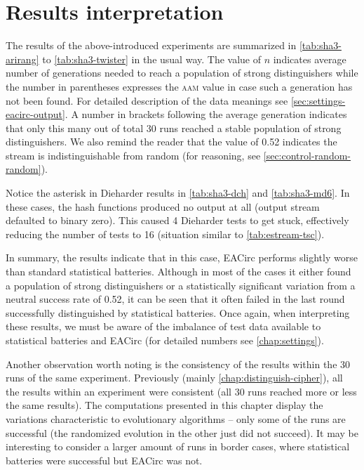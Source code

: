 \documentclass[12pt,oneside]{fithesis2}		%
\renewcommand{\_}{\leavevmode \kern0.0em\vbox{\hrule width0.4em}}
\begin{document}
\section{Results interpretation}
\label{sec:hash-results}

The results of the above-introduced experiments are summarized in \autoref{tab:sha3-arirang} to \autoref{tab:sha3-twister} 
in the usual way. 
The value of $n$ indicates average number of generations needed to reach a population of
strong distinguishers while the number in parentheses expresses the \textsc{aam} value in case such a generation has not been
found. For detailed description of the data meanings see \autoref{sec:settings-eacirc-output}. 
A number in brackets following the average generation indicates that only this many
out of total 30 runs reached a stable population of strong distinguishers. We also remind the reader
that the value of 0.52 indicates the stream is indistinguishable from random (for reasoning, see \autoref{sec:control-random-random}).

Notice the asterisk in Dieharder results in \autoref{tab:sha3-dch} and \autoref{tab:sha3-md6}.
In these cases, the hash functions produced no output at all (output stream defaulted to binary zero).
This caused 4 Dieharder tests to get stuck, effectively reducing the number of tests to 16 
(situation similar to \autoref{tab:estream-tsc}).

In summary, the results indicate that in this case, EACirc performs slightly worse than standard statistical batteries.
Although in most of the cases it either found a population of strong distinguishers or a statistically significant variation
from a neutral success rate of 0.52, it can be seen that it often failed in the last round successfully distinguished
by statistical batteries. Once again, when interpreting these results, we must be aware of the imbalance of test data
available to statistical batteries and EACirc (for detailed numbers see \autoref{chap:settings}).

Another observation worth noting is the consistency of the results within the 30 runs of the same experiment.
Previously (mainly \autoref{chap:distinguish-cipher}), all the results within an experiment were consistent 
(all 30 runs reached more or less the same results).
The computations presented in this chapter display the variations characteristic to evolutionary algorithms -- 
only some of the runs are successful (the randomized evolution in the other just did not succeed).
It may be interesting to consider a larger amount of runs in border cases, where statistical batteries were successful
but EACirc was not.
\vfill
\end{document}
